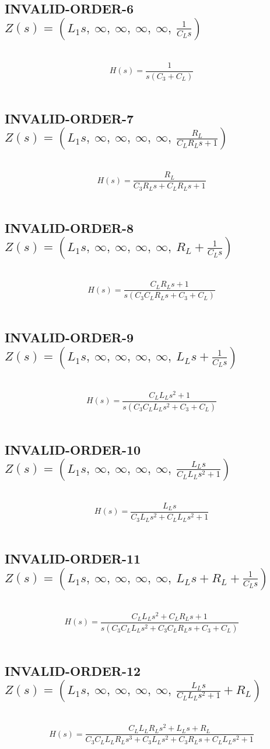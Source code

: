 \documentclass{article}
\begin{document}
\subsection{INVALID-ORDER-6 $Z(s) = \left( L_{1} s, \  \infty, \  \infty, \  \infty, \  \infty, \  \frac{1}{C_{L} s}\right)$ } \ 
\textbf{\[H(s) = \frac{1}{s \left(C_{3} + C_{L}\right)}\] } \ 
\subsection{INVALID-ORDER-7 $Z(s) = \left( L_{1} s, \  \infty, \  \infty, \  \infty, \  \infty, \  \frac{R_{L}}{C_{L} R_{L} s + 1}\right)$ } \ 
\textbf{\[H(s) = \frac{R_{L}}{C_{3} R_{L} s + C_{L} R_{L} s + 1}\] } \ 
\subsection{INVALID-ORDER-8 $Z(s) = \left( L_{1} s, \  \infty, \  \infty, \  \infty, \  \infty, \  R_{L} + \frac{1}{C_{L} s}\right)$ } \ 
\textbf{\[H(s) = \frac{C_{L} R_{L} s + 1}{s \left(C_{3} C_{L} R_{L} s + C_{3} + C_{L}\right)}\] } \ 
\subsection{INVALID-ORDER-9 $Z(s) = \left( L_{1} s, \  \infty, \  \infty, \  \infty, \  \infty, \  L_{L} s + \frac{1}{C_{L} s}\right)$ } \ 
\textbf{\[H(s) = \frac{C_{L} L_{L} s^{2} + 1}{s \left(C_{3} C_{L} L_{L} s^{2} + C_{3} + C_{L}\right)}\] } \ 
\subsection{INVALID-ORDER-10 $Z(s) = \left( L_{1} s, \  \infty, \  \infty, \  \infty, \  \infty, \  \frac{L_{L} s}{C_{L} L_{L} s^{2} + 1}\right)$ } \ 
\textbf{\[H(s) = \frac{L_{L} s}{C_{3} L_{L} s^{2} + C_{L} L_{L} s^{2} + 1}\] } \ 
\subsection{INVALID-ORDER-11 $Z(s) = \left( L_{1} s, \  \infty, \  \infty, \  \infty, \  \infty, \  L_{L} s + R_{L} + \frac{1}{C_{L} s}\right)$ } \ 
\textbf{\[H(s) = \frac{C_{L} L_{L} s^{2} + C_{L} R_{L} s + 1}{s \left(C_{3} C_{L} L_{L} s^{2} + C_{3} C_{L} R_{L} s + C_{3} + C_{L}\right)}\] } \ 
\subsection{INVALID-ORDER-12 $Z(s) = \left( L_{1} s, \  \infty, \  \infty, \  \infty, \  \infty, \  \frac{L_{L} s}{C_{L} L_{L} s^{2} + 1} + R_{L}\right)$ } \ 
\textbf{\[H(s) = \frac{C_{L} L_{L} R_{L} s^{2} + L_{L} s + R_{L}}{C_{3} C_{L} L_{L} R_{L} s^{3} + C_{3} L_{L} s^{2} + C_{3} R_{L} s + C_{L} L_{L} s^{2} + 1}\] } \ 
\end{document}
